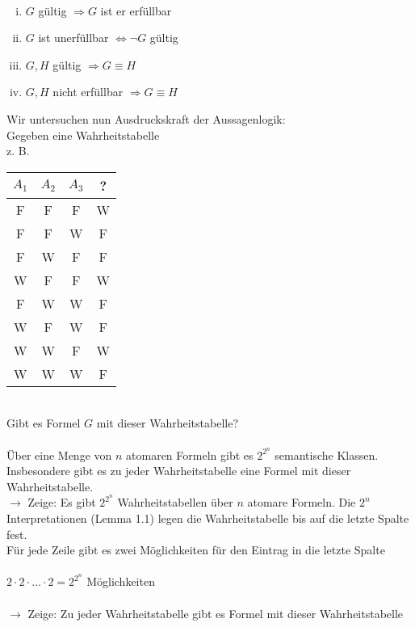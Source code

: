 \noindent\\
\bemerkung{}
\begin{enumerate}[i)]
\item $G$ gültig $\Rightarrow G$ ist er erfüllbar
\item $G$ ist unerfüllbar $\Leftrightarrow \neg G$ gültig
\item $G, H$ gültig $\Rightarrow G \equiv H$
\item $G, H$ nicht erfüllbar $\Rightarrow G \equiv H$
\end{enumerate}

\noindent
Wir untersuchen nun Ausdruckskraft der Aussagenlogik:\\
Gegeben eine Wahrheitstabelle\\
z. B.\\
\begin{tabular}{c|c|c|c}
$A_1$ & $A_2$ & $A_3$ & ?\\
\hline
F & F & F & W\\
F & F & W & F\\
F & W & F & F\\
W & F & F & W\\
F & W & W & F\\
W & F & W & F\\
W & W & F & W\\
W & W & W & F
\end{tabular}\\
Gibt es Formel $G$ mit dieser Wahrheitstabelle?\\

\noindent\\
Über eine Menge von $n$ atomaren Formeln gibt es $2^{2^{n}}$ semantische Klassen. Insbesondere gibt es zu jeder Wahrheitstabelle eine Formel mit dieser Wahrheitstabelle.\\
    
\beweis{}
$\rightarrow$ Zeige: Es gibt $2^{2^n}$ Wahrheitstabellen über $n$ atomare Formeln. Die $2^n$ Interpretationen (Lemma 1.1) legen die Wahrheitstabelle bis auf die letzte Spalte fest.\\
Für jede Zeile gibt es zwei Möglichkeiten für den Eintrag in die letzte Spalte\\
\noindent\\
$2 \cdot 2 \cdot … \cdot 2 = 2^{2^n}$ Möglichkeiten\\
    
\noindent\\
$\rightarrow$ Zeige: Zu jeder Wahrheitstabelle gibt es Formel mit dieser Wahrheitstabelle\\
    
